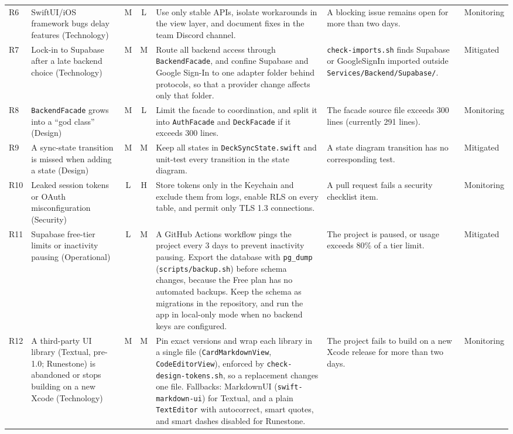 \documentclass[12pt,letterpaper]{article}
\begin{document}
\begin{xltabular}{\textwidth}{@{}l L{3.0cm} c c Y L{2.9cm} L{1.5cm}@{}}
R6 & SwiftUI/iOS framework bugs delay features (Technology) & M & L & Use only stable APIs, isolate workarounds in the view layer, and document fixes in the team Discord channel. & A blocking issue remains open for more than two days. & Monitoring \\
R7 & Lock-in to Supabase after a late backend choice (Technology) & M & M & Route all backend access through \texttt{BackendFacade}, and confine Supabase and Google Sign-In to one adapter folder behind protocols, so that a provider change affects only that folder. & \texttt{check-imports.sh} finds Supabase or GoogleSignIn imported outside \texttt{Services/\allowbreak Backend/\allowbreak Supabase/}. & Mitigated \\
R8 & \texttt{BackendFacade} grows into a ``god class'' (Design) & M & L & Limit the facade to coordination, and split it into \texttt{AuthFacade} and \texttt{DeckFacade} if it exceeds 300 lines. & The facade source file exceeds 300 lines (currently 291 lines). & Monitoring \\
R9 & A sync-state transition is missed when adding a state (Design) & M & M & Keep all states in \texttt{DeckSyncState.swift} and unit-test every transition in the state diagram. & A state diagram transition has no corresponding test. & Mitigated \\
R10 & Leaked session tokens or OAuth misconfiguration (Security) & L & H & Store tokens only in the Keychain and exclude them from logs, enable RLS on every table, and permit only TLS 1.3 connections. & A pull request fails a security checklist item. & Monitoring \\
R11 & Supabase free-tier limits or inactivity pausing (Operational) & L & M & A GitHub Actions workflow pings the project every 3 days to prevent inactivity pausing. Export the database with \texttt{pg\_dump} (\texttt{scripts/backup.sh}) before schema changes, because the Free plan has no automated backups. Keep the schema as migrations in the repository, and run the app in local-only mode when no backend keys are configured. & The project is paused, or usage exceeds 80\% of a tier limit. & Mitigated \\
R12 & A third-party UI library (Textual, pre-1.0; Runestone) is abandoned or stops building on a new Xcode (Technology) & M & M & Pin exact versions and wrap each library in a single file (\texttt{CardMarkdownView}, \texttt{CodeEditorView}), enforced by \texttt{check-design-tokens.sh}, so a replacement changes one file. Fallbacks: MarkdownUI (\texttt{swift-markdown-ui}) for Textual, and a plain \texttt{TextEditor} with autocorrect, smart quotes, and smart dashes disabled for Runestone. & The project fails to build on a new Xcode release for more than two days. & Monitoring \\
\end{xltabular}
\end{document}
